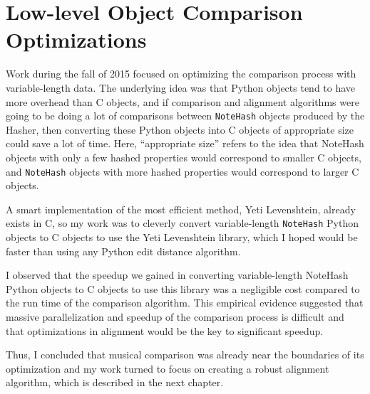 \section{Low-level Object Comparison Optimizations} \label{spaceoptimizations}
Work during the fall of 2015 focused on optimizing the comparison process with variable-length data. The underlying idea was that Python objects tend to have more overhead than C objects, and if comparison and alignment algorithms were going to be doing a lot of comparisons between \texttt{NoteHash} objects produced by the Hasher, then converting these Python objects into C objects of appropriate size could save a lot of time. Here, ``appropriate size'' refers to the idea that NoteHash objects with only a few hashed properties would correspond to smaller C objects, and \texttt{NoteHash} objects with more hashed properties would correspond to larger C objects. 

A smart implementation of the most efficient method, Yeti Levenshtein, already exists in C, so my work was to cleverly convert variable-length \texttt{NoteHash} Python objects to C objects to use the Yeti Levenshtein library\cite{yeti}, which I hoped would be faster than using any Python edit distance algorithm.

I observed that the speedup we gained in converting variable-length NoteHash Python objects to C objects to use this library was a negligible cost compared to the run time of the comparison algorithm. This empirical evidence suggested that massive parallelization and speedup of the comparison process is difficult and that optimizations in alignment would be the key to significant speedup.

Thus, I concluded that musical comparison was already near the boundaries of its optimization and my work turned to focus on creating a robust alignment algorithm, which is described in the next chapter.  